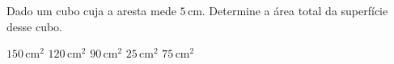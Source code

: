 Dado um cubo cuja a aresta mede $5$\,cm. Determine a área total da superfície desse cubo.

$150$\,cm$^2$
$120$\,cm$^2$
$90$\,cm$^2$
$25$\,cm$^2$
$75$\,cm$^2$



